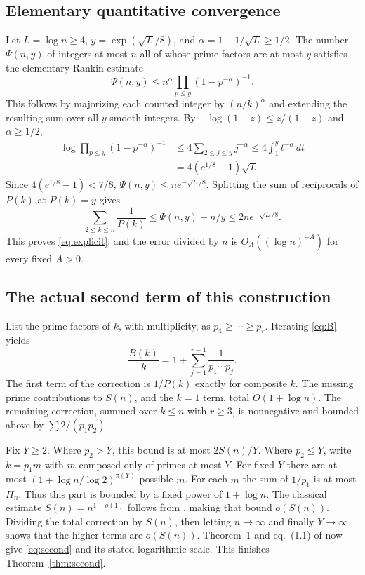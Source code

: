 \documentclass[11pt]{article}
\theoremstyle{remark}
\begin{document}
\subsection{Elementary quantitative convergence}
Let $L=\log n\ge4$, $y=\exp(\sqrt L/8)$, and $\alpha=1-1/\sqrt L\ge1/2$. The number $\Psi(n,y)$ of integers at most $n$ all of whose prime factors are at most $y$ satisfies the elementary Rankin estimate
\[
 \Psi(n,y)\le n^\alpha\prod_{p\le y}(1-p^{-\alpha})^{-1}.
\]
This follows by majorizing each counted integer by $(n/k)^\alpha$ and extending the resulting sum over all $y$-smooth integers. By $-\log(1-z)\le z/(1-z)$ and $\alpha\ge1/2$,
\begin{align*}
 \log\prod_{p\le y}(1-p^{-\alpha})^{-1}
 &\le4\sum_{2\le j\le y}j^{-\alpha}\le4\int_1^y t^{-\alpha}\,dt\\
 &=4(e^{1/8}-1)\sqrt L.
\end{align*}
Since $4(e^{1/8}-1)<7/8$, $\Psi(n,y)\le n e^{-\sqrt L/8}$. Splitting the sum of reciprocals of $P(k)$ at $P(k)=y$ gives
\[ \sum_{2\le k\le n}\frac1{P(k)}\le\Psi(n,y)+n/y\le2n e^{-\sqrt L/8}. \]
This proves \eqref{eq:explicit}, and the error divided by $n$ is $O_A((\log n)^{-A})$ for every fixed $A>0$.

\subsection{The actual second term of this construction}
List the prime factors of $k$, with multiplicity, as $p_1\ge\cdots\ge p_r$. Iterating \eqref{eq:B} yields
\[
 \frac{B(k)}k=1+\sum_{j=1}^{r-1}\frac1{p_1\cdots p_j}.
\]
The first term of the correction is $1/P(k)$ exactly for composite $k$. The missing prime contributions to $S(n)$, and the $k=1$ term, total $O(1+\log n)$. The remaining correction, summed over $k\le n$ with $r\ge3$, is nonnegative and bounded above by $\sum 2/(p_1p_2)$.

Fix $Y\ge2$. Where $p_2>Y$, this bound is at most $2S(n)/Y$. Where $p_2\le Y$, write $k=p_1 m$ with $m$ composed only of primes at most $Y$. For fixed $Y$ there are at most $(1+\log n/\log 2)^{\pi(Y)}$ possible $m$. For each $m$ the sum of $1/p_1$ is at most $H_n$. Thus this part is bounded by a fixed power of $1+\log n$. The classical estimate $S(n)=n^{1-o(1)}$ follows from \cite[eq.~(1.1)]{EIP}, making that bound $o(S(n))$. Dividing the total correction by $S(n)$, then letting $n\to\infty$ and finally $Y\to\infty$, shows that the higher terms are $o(S(n))$. Theorem~1 and eq.~(1.1) of \cite{EIP} now give \eqref{eq:second} and its stated logarithmic scale. This finishes Theorem~\ref{thm:second}.
\end{document}
